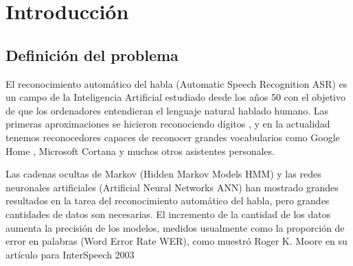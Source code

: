 \chapter{Introducción}

\section{Definición del problema}

El reconocimiento automático del habla (Automatic Speech Recognition ASR) es un campo de la Inteligencia Artificial estudiado desde los años 50 con el objetivo de que los ordenadores entendieran el lenguaje natural hablado humano. Las primeras aproximaciones se hicieron reconociendo dígitos \cite{Davis1952AutomaticDigits}, y en la actualidad tenemos reconocedores capaces de reconocer grandes vocabularios como Google Home \cite{Li2017}, Microsoft Cortana \cite{Xiong2017} y muchos otros asistentes personales.

Las cadenas ocultas de Markov (Hidden Markov Models HMM) \cite{RabinerARecognition,PaulTheRecognizer,Zue1989TheReport} y las redes neuronales artificiales (Artificial Neural Networks ANN) \cite{Waibel1989PhonemeNetworks,XuedongHuangAlexAceroHsiao-WuenHon201,Hwang} han mostrado grandes resultados en la tarea del reconocimiento automático del habla, pero grandes cantidades de datos son necesarias. El incremento de la cantidad de los datos aumenta la precisión de los modelos, medidos usualmente como la proporción de error en palabras (Word Error Rate WER), como muestró Roger K. Moore en su artículo para InterSpeech 2003

